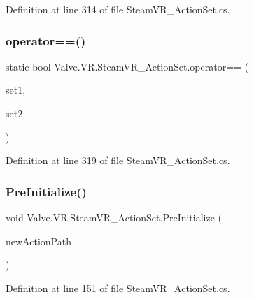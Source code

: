 Definition at line 314 of file Steam\+V\+R\+\_\+\+Action\+Set.\+cs.

\mbox{\label{class_valve_1_1_v_r_1_1_steam_v_r___action_set_a3eb69b39d2ee970d0f2a4f932d5312a4}} 
\subsubsection{\texorpdfstring{operator==()}{operator==()}}
{\footnotesize\ttfamily static bool Valve.\+V\+R.\+Steam\+V\+R\+\_\+\+Action\+Set.\+operator== (\begin{DoxyParamCaption}\item[{\mbox{\hyperlink{class_valve_1_1_v_r_1_1_steam_v_r___action_set}{Steam\+V\+R\+\_\+\+Action\+Set}}}]{set1,  }\item[{\mbox{\hyperlink{class_valve_1_1_v_r_1_1_steam_v_r___action_set}{Steam\+V\+R\+\_\+\+Action\+Set}}}]{set2 }\end{DoxyParamCaption})\hspace{0.3cm}{\ttfamily [static]}}



Definition at line 319 of file Steam\+V\+R\+\_\+\+Action\+Set.\+cs.

\mbox{\label{class_valve_1_1_v_r_1_1_steam_v_r___action_set_ab74fc162e267b0074066bff7b0166fc3}} 
\subsubsection{\texorpdfstring{PreInitialize()}{PreInitialize()}}
{\footnotesize\ttfamily void Valve.\+V\+R.\+Steam\+V\+R\+\_\+\+Action\+Set.\+Pre\+Initialize (\begin{DoxyParamCaption}\item[{string}]{new\+Action\+Path }\end{DoxyParamCaption})}



Definition at line 151 of file Steam\+V\+R\+\_\+\+Action\+Set.\+cs.

\mbox{\label{class_valve_1_1_v_r_1_1_steam_v_r___action_set_a212fb34fda9aa2be57a9a78e3ca6fe0f}} 

